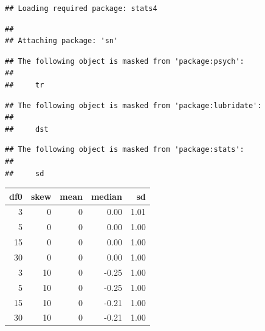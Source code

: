\documentclass[
]{book}
\newenvironment{Shaded}{\begin{snugshade}}{\end{snugshade}}
\newcommand{\AttributeTok}[1]{\textcolor[rgb]{0.13,0.29,0.53}{#1}}
\newcommand{\DecValTok}[1]{\textcolor[rgb]{0.00,0.00,0.81}{#1}}
\newcommand{\FunctionTok}[1]{\textcolor[rgb]{0.13,0.29,0.53}{\textbf{#1}}}
\newcommand{\NormalTok}[1]{#1}
\newcommand{\OtherTok}[1]{\textcolor[rgb]{0.56,0.35,0.01}{#1}}
\newcommand{\SpecialCharTok}[1]{\textcolor[rgb]{0.81,0.36,0.00}{\textbf{#1}}}
\begin{document}
\begin{verbatim}
## Loading required package: stats4
\end{verbatim}

\begin{verbatim}
## 
## Attaching package: 'sn'
\end{verbatim}

\begin{verbatim}
## The following object is masked from 'package:psych':
## 
##     tr
\end{verbatim}

\begin{verbatim}
## The following object is masked from 'package:lubridate':
## 
##     dst
\end{verbatim}

\begin{verbatim}
## The following object is masked from 'package:stats':
## 
##     sd
\end{verbatim}

\begin{Shaded}
\end{Shaded}

\begin{tabular}{r|r|r|r|r}
\hline
df0 & skew & mean & median & sd\\
\hline
3 & 0 & 0 & 0.00 & 1.01\\
\hline
5 & 0 & 0 & 0.00 & 1.00\\
\hline
15 & 0 & 0 & 0.00 & 1.00\\
\hline
30 & 0 & 0 & 0.00 & 1.00\\
\hline
3 & 10 & 0 & -0.25 & 1.00\\
\hline
5 & 10 & 0 & -0.25 & 1.00\\
\hline
15 & 10 & 0 & -0.21 & 1.00\\
\hline
30 & 10 & 0 & -0.21 & 1.00\\
\hline
\end{tabular}
\end{document}
